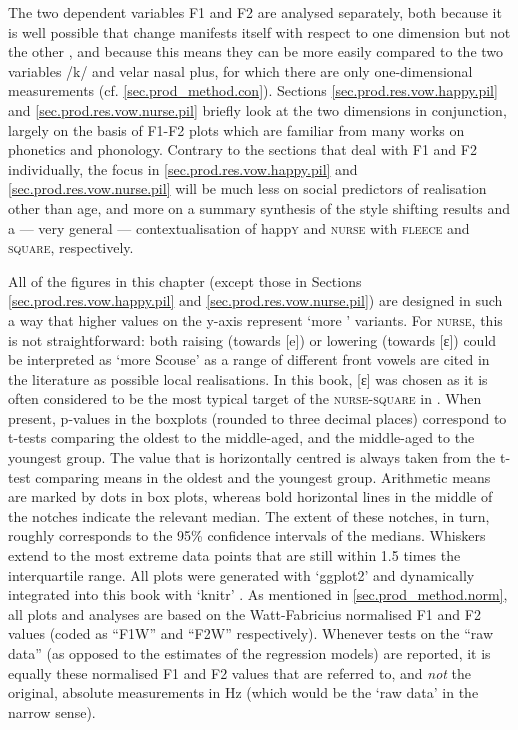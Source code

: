 The two dependent variables F1 and F2 are analysed separately, both because it is well possible that change manifests itself with respect to one dimension but not the other \parencite[cf.][]{harrington2006}, and because this means they can be more easily compared to the two  variables /k/ and velar nasal plus, for which there are only one-dimensional measurements (cf. \ref{sec.prod_method.con}).
Sections \ref{sec.prod.res.vow.happy.pil} and \ref{sec.prod.res.vow.nurse.pil} briefly look at the two dimensions in conjunction, largely on the basis of F1-F2  plots which are familiar from many works on phonetics and phonology.
Contrary to the sections that deal with F1 and F2 individually, the focus in \ref{sec.prod.res.vow.happy.pil} and \ref{sec.prod.res.vow.nurse.pil} will be much less on social predictors of  realisation other than age, and more on a summary synthesis of the style shifting results and a --- very general --- contextualisation of happ\textsc{y} and \textsc{nurse} with \textsc{fleece} and \textsc{square}, respectively.

All of the figures in this chapter (except those in Sections \ref{sec.prod.res.vow.happy.pil} and \ref{sec.prod.res.vow.nurse.pil}) are designed in such a way that higher values on the y-axis represent `more ' variants.
For \textsc{nurse}, this is not straightforward: both raising (towards [e]) or lowering (towards [ɛ]) could be interpreted as \enquote*{more Scouse} as a range of different front vowels are cited in the literature as possible local realisations.
In this book, [ɛ] was chosen as it is often considered to be the most typical target of the \textsc{nurse}-\textsc{square}  in .
When present, p-values in the boxplots (rounded to three decimal places) correspond to t-tests comparing the oldest to the middle-aged, and the middle-aged to the youngest group.
The value that is horizontally centred is always taken from the t-test comparing means in the oldest and the youngest group.
Arithmetic means are marked by dots in box plots, whereas bold horizontal lines in the middle of the notches indicate the relevant median.
The extent of these notches, in turn, roughly corresponds to the 95\% confidence intervals of the medians.
Whiskers extend to the most extreme data points that are still within 1.5 times the interquartile range.
All plots were generated with `ggplot2' \parencite{ggplot2} and dynamically integrated into this book with `knitr' \parencite{knitr}.
As mentioned in \ref{sec.prod_method.norm}, all  plots and analyses are based on the Watt-Fabricius normalised F1 and F2 values (coded as ``F1W'' and ``F2W'' respectively).
Whenever tests on the ``raw data'' (as opposed to the estimates of the regression models) are reported, it is equally these normalised F1 and F2 values that are referred to, and \emph{not} the original, absolute measurements in Hz (which would be the `raw data' in the narrow sense).

